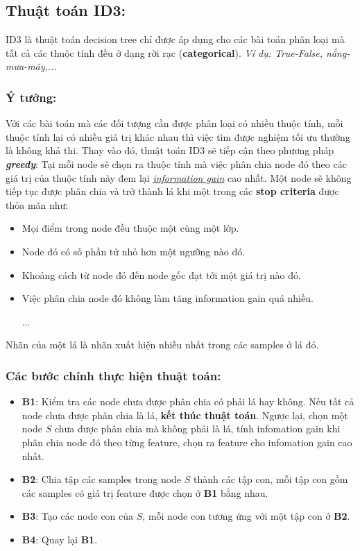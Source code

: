 \documentclass[12pt, a4paper]{article}
\begin{document}
\subsection{Thuật toán ID3:}

ID3 là thuật toán decision tree chỉ được áp dụng cho các bài toán phân loại mà tất cả các thuộc tính đều ở dạng rời rạc (\textbf{categorical}). \textit{Ví dụ: True-False, nắng-mưa-mây,...} 

\subsubsection{Ý tưởng:}

Với các bài toán mà các đối tượng cần được phân loại có nhiều thuộc tính, mỗi thuộc tính lại có nhiều giá trị khác nhau thì việc tìm được nghiệm tối ưu thường là không khả thi. Thay vào đó, thuật toán ID3 sẽ tiếp cận theo phương pháp \textbf{\textit{greedy}}: Tại mỗi node sẽ chọn ra thuộc tính mà việc phân chia node đó theo các giá trị của thuộc tính này đem lại \textit{\hyperlink{*}{information gain}} cao nhất. Một node sẽ không tiếp tục được phân chia và trở thành lá khi một trong các \textbf{stop criteria} được thỏa mãn như:
\begin{itemize}
    \item Mọi điểm trong node đều thuộc một cùng một lớp.
    \item Node đó có số phần tử nhỏ hơn một ngưỡng nào đó.
    \item Khoảng cách từ node đó đến node gốc đạt tới một giá trị nào đó.
    \item Việc phân chia node đó không làm tăng information gain quá nhiều.
    
    ...
\end{itemize}

Nhãn của một lá là nhãn xuất hiện nhiều nhất trong các samples ở lá đó.

\subsubsection{Các bước chính thực hiện thuật toán:}

\begin{itemize}
    \item \textbf{B1}: Kiểm tra các node chưa được phân chia có phải lá hay không. Nếu tất cả node chưa được phân chia là  lá, \textbf{kết thúc thuật toán}. Ngược lại, chọn một node $S$ chưa được phân chia mà không phải là lá, tính infomation gain khi phân chia node đó theo từng feature, chọn ra feature cho infomation gain cao nhất.
    \item \textbf{B2}: Chia tập các samples trong node $S$ thành các tập con, mỗi tập con gồm các samples có giá trị feature được chọn ở \textbf{B1}  bằng nhau.
    \item \textbf{B3}: Tạo các node con của $S$, mỗi node con tương ứng với một tập con ở \textbf{B2}.
    \item \textbf{B4}: Quay lại \textbf{B1}.
    
    
\end{itemize}
\end{document}
